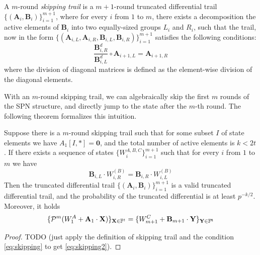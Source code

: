 \documentclass[11pt]{article}
\begin{document}
 \begin{definition}   A $m$-round \emph{skipping  trail} is a $m+1$-round truncated differential   trail $\{(\mathbf{A}_i,\mathbf{B}_i)\}_{i=1}^{m+1}$,
   where for every $i$ from $1$ to $m$,  there exists a decomposition
   the active elements of $\mathbf{B}_i$ into two equally-sized groups $L_i$ and $R_i$, such that the trail,
   now in the form $\{(\mathbf{A}_{i,L},\mathbf{A}_{i,R},\mathbf{B}_{i,L},\mathbf{B}_{i,R})\}_{i=1}^{m+1}$ satisfies the following conditions:
   $$
\frac{\mathbf{B}_{i,R}^d}{\mathbf{B}_{i,L}^d}\circ \mathbf{A}_{i+1,L} = \mathbf{A}_{i+1,R}
    $$
    where the division of diagonal matrices is defined as the element-wise division of the diagonal elements.
 \end{definition}
With an $m$-round skipping trail, we can algebraically skip the first $m$ rounds of the SPN structure,
and directly jump to the state after the $m$-th round. The following theorem formalizes this intuition.
\begin{theorem}
    Suppose there is a $m$-round skipping trail such that for some subset $I$ of state elements we have $A_1[I,*]=\mathbf{0}$, and
     the total number of active elements
     is $k<2t$. If there exists a sequence of states $\{W_i^{A,B,C}\}_{i=1}^{m+1}$ such that for every $i$ from $1$ to $m$ we have
    \begin{equation}
        \mathbf{B}_{i,L}\cdot W_{i,R}^{(B)} = \mathbf{B}_{i,R}\cdot W_{i,L}^{(B)}\label{eq:skipping}
    \end{equation}
    Then the truncated differential trail $\{(\mathbf{A}_i,\mathbf{B}_i)\}_{i=1}^{m+1}$ is a valid truncated differential trail,
    and the probability of the truncated differential is at least $p^{-k/2}$. Moreover,   it holds
    \begin{equation}
        \{\mathcal{P}^m(W_1^A+\mathbf{A}_1\cdot\mathbf{X})\}_{\mathbf{X}\in\mathbb{F}^t} =  \{W_{m+1}^C+\mathbf{B}_{m+1}\cdot\mathbf{Y}\}_{\mathbf{Y\in\mathbb{F}^t}}\label{eq:skipping2}
    \end{equation}
\end{theorem}
\begin{proof}
    TODO (just apply the definition of skipping trail and the condition \ref{eq:skipping} to get \ref{eq:skipping2}).
\end{proof}
\end{document}
